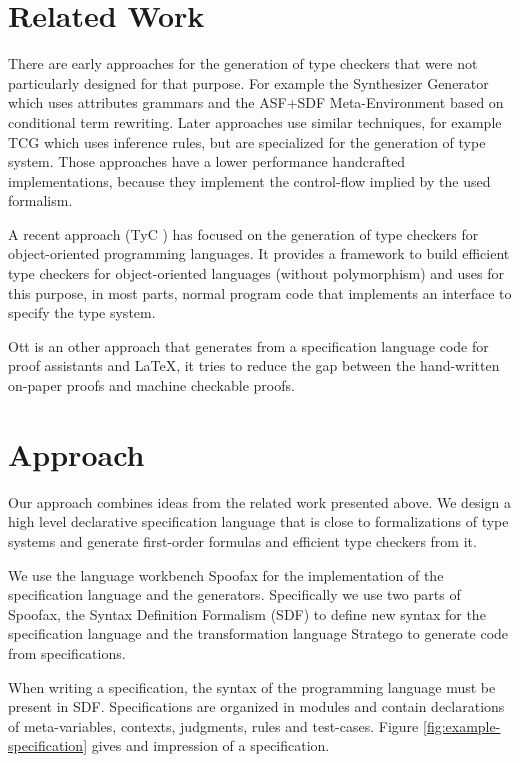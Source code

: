 \documentclass{acm_proc_article-sp}
\begin{document}
\section{Related Work}
There are early approaches for the generation of type checkers that
were not particularly designed for that purpose. For example the
Synthesizer Generator \cite{Reps:1984:SG:800020.808247} which uses
attributes grammars and the ASF+SDF Meta-Environment
\cite{vandenBrand:2001:AMC:647477.727788} based on conditional term
rewriting. Later approaches use similar techniques, for example TCG
\cite{phd/de/Gast2005} which uses inference rules, but are specialized
for the generation of type system. Those approaches have a lower
performance handcrafted implementations, because they implement the
control-flow implied by the used formalism.

A recent approach (TyC \cite{ortin2014automatic}) has focused on the
generation of type checkers for object-oriented programming
languages. It provides a framework to build efficient type checkers
for object-oriented languages (without polymorphism) and uses for this
purpose, in most parts, normal program code that implements an
interface to specify the type system.

Ott \cite{journals/jfp/SewellNOPRSS10} is an other approach that
generates from a specification language code for proof assistants and
\LaTeX, it tries to reduce the gap between the hand-written on-paper
proofs and machine checkable proofs.
\section{Approach}
Our approach combines ideas from the related work presented above. We
design a high level declarative specification language that is close
to formalizations of type systems and generate first-order formulas
and efficient type checkers from it.

We use the language workbench Spoofax \cite{KatsVisser2010} for the
implementation of the specification language and the
generators. Specifically we use two parts of Spoofax, the Syntax
Definition Formalism (SDF) to define new syntax for the specification
language and the transformation language Stratego to generate code
from specifications. 

When writing a specification, the syntax of the programming language
must be present in SDF. Specifications are organized in modules and
contain declarations of meta-variables, contexts, judgments, rules and
test-cases. Figure \ref{fig:example-specification} gives and
impression of a specification.
\end{document}
